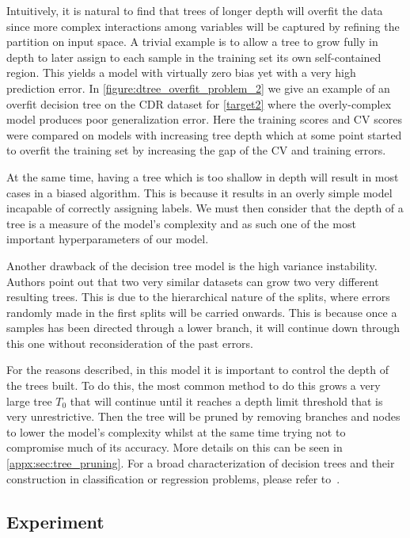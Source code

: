 Intuitively, it is natural to find that trees of longer depth will overfit the data since more complex interactions among variables will be captured by refining the partition on input space.
A trivial example is to allow a tree to grow fully in depth to later assign to each sample in the training set its own self-contained region.
This yields a model with virtually zero bias yet with a very high prediction error.
In \cref{figure:dtree_overfit_problem_2} we give an example of an overfit decision tree on the CDR dataset for \cref{target2} where the overly-complex model produces poor generalization error.
Here the training scores and CV scores were compared on models with increasing tree depth which at some point started to overfit the training set by increasing the gap of the CV and training errors.

At the same time, having a tree which is too shallow in depth will result in most cases in a biased algorithm.
This is because it results in an overly simple model incapable of correctly assigning labels.
We must then consider that the depth of a tree is a measure of the model's complexity and as such one of the most important hyperparameters of our model.

Another drawback of the decision tree model is the high variance instability.
Authors point out that two very similar datasets can grow two very different resulting trees.
This is due to the hierarchical nature of the splits, where errors randomly made in the first splits will be carried onwards.
This is because once a samples has been directed through a lower branch, it will continue down through this one without reconsideration of the past errors.

For the reasons described, in this model it is important to control the depth of the trees built.
To do this, the most common method to do this grows a very large tree $T_0$ that will continue until it reaches a depth limit threshold that is very unrestrictive.
Then the tree will be pruned by removing branches and nodes to lower the model's complexity whilst at the same time trying not to compromise much of its accuracy.
More details on this can be seen in \cref{appx:sec:tree_pruning}.
For a broad characterization of decision trees and their construction in classification or regression problems, please refer to~\cite{breiman-cart84}.

\subsection{Experiment}\label{subsection:decision_trees_experiment}

